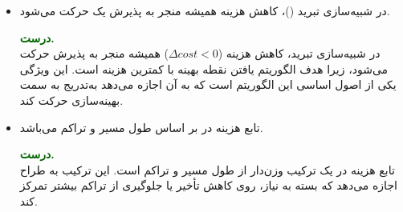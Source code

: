 \begin{itemize}
	
	\item در شبیه‌سازی تبرید ()، کاهش هزینه همیشه منجر به پذیرش یک حرکت می‌شود.
	\begin{qsolve}
		\textbf{\textcolor{darkgreen}{درست.}}\\
		در شبیه‌سازی تبرید، کاهش هزینه ($\Delta cost < 0$) همیشه منجر به پذیرش حرکت می‌شود، زیرا هدف الگوریتم یافتن نقطه بهینه با کمترین هزینه است. این ویژگی یکی از اصول اساسی این الگوریتم است که به آن اجازه می‌دهد به‌تدریج به سمت بهینه‌سازی حرکت کند.
	\end{qsolve}
	
	
	\item تابع هزینه در  بر اساس طول مسیر و تراکم می‌باشد.
	\begin{qsolve}
		\textbf{\textcolor{darkgreen}{درست.}}\\
		تابع هزینه در  یک ترکیب وزن‌دار از طول مسیر و تراکم است. این ترکیب به طراح اجازه می‌دهد که بسته به نیاز، روی کاهش تأخیر یا جلوگیری از تراکم بیشتر تمرکز کند.
	\end{qsolve}
	
\end{itemize}












